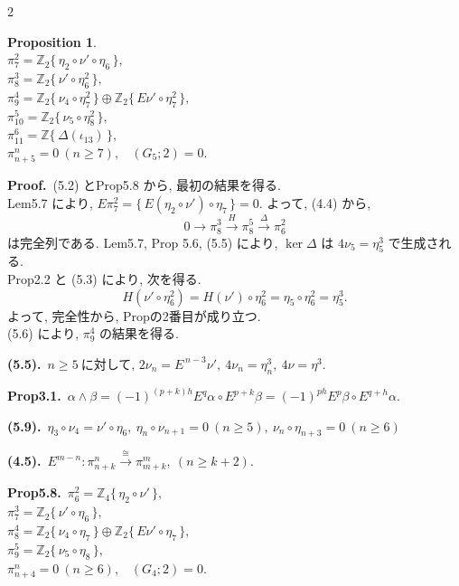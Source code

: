 \documentclass[10pt, leqno]{ltjsarticle}
\newcommand{\gen}[1]{\{\,#1\,\}}       %
\newcommand{\pit}[2]{\pi_{#1}^{#2}}
\numberwithin{equation}{section}
\theoremstyle{plain}
\newtheorem{proposition}[theorem]{Proposition}
\theoremstyle{definition}
\theoremstyle{remark}
\begin{document}
\begin{paracol}{2}
\begin{proposition}\label{prop:5.9}
\ \\
\(\pi^{2}_{7}=\mathbb Z_2\gen{\eta_{2}\circ\nu'\circ\eta_6},\) \\
\(\pi^{3}_{8}=\mathbb Z_2\gen{\nu'\circ\eta_6^2},\) \\
\(\pi^{4}_{9}=\mathbb Z_2\gen{\nu_{4}\circ\eta_7^2}\oplus \mathbb Z_2\gen{E\nu'\circ\eta_7^2},\) \\
\(\pi^{5}_{10}=\mathbb Z_2\gen{\nu_{5}\circ\eta_8^2},\) \\
\(\pi^{6}_{11}=\mathbb Z\gen{\Delta(\iota_{13})},\) \\
\(\pi^{n}_{n+5}=0\ (n\ge7),\) \
\((G_{5};2)=0.\)
\end{proposition}

\noindent
\textbf{Proof.}\ 
(5.2) とProp5.8 から, 最初の結果を得る. \\
Lem5.7 により, \(E\pi_7^2=\gen{E(\eta_2\circ\nu')\circ\eta_7}=0 .\)
よって, (4.4) から, 
\[
0\to \pi^{3}_{8}\xrightarrow{H}\pi^{5}_{8}\xrightarrow{\Delta}\pi^{2}_{6}
\]
は完全列である. 
Lem5.7, Prop 5.6, (5.5) により, \(\ker\Delta\) は \(4\nu_5=\eta_5^3\) で生成される. \\
Prop2.2 と (5.3) により, 次を得る. 
\[
H(\nu'\circ \eta_6^2)=H(\nu')\circ \eta_6^2=\eta_5\circ \eta_6^2=\eta_5^{3}.
\]
よって, 完全性から, Propの2番目が成り立つ. \\
(5.6) により, \(\pi_9^4\) の結果を得る. 

\switchcolumn

\noindent
\textbf{(5.5).}\
\(n\ge5\ \text{に対して, } 2\nu_n=E^{\,n-3}\nu',\
4\nu_{n}=\eta_n^{3},\ 4\nu=\eta^{3}.\)

\noindent
\textbf{Prop3.1.}\
\(
\alpha \wedge \beta
= (-1)^{(p+k)h} E^{q}\alpha \circ E^{p+k}\beta
= (-1)^{ph} E^{p}\beta \circ E^{q+h}\alpha .
\)

\noindent
\textbf{(5.9).}\
\(\eta_3\circ \nu_4= \nu'\circ \eta_6,\
\eta_n\circ \nu_{n+1}=0\ (n\ge5),\
\nu_n\circ \eta_{n+3}=0\ (n\ge6)\)

\noindent
\textbf{(4.5).}\
\(E^{m-n}:\pit{n+k}{n}\xrightarrow{\cong}\pit{m+k}{m},\
(n\ge k+2). \)

\noindent
\textbf{Prop5.8.}\
\(\pi^{2}_{6}=\mathbb Z_4\gen{\eta_{2}\circ\nu'},\) \\
\(\pi^{3}_{7}=\mathbb Z_2\gen{\nu'\circ\eta_6},\) \\
\(\pi^{4}_{8}=\mathbb Z_2\gen{\nu_{4}\circ\eta_7}\oplus \mathbb Z_2\gen{E\nu'\circ\eta_7},\) \\
\(\pi^{5}_{9}=\mathbb Z_2\gen{\nu_{5}\circ\eta_8},\) \\
\(\pi^{n}_{n+4}=0\ (n\ge6),\) \
\((G_{4};2)=0.\)


\end{paracol}
\end{document}
